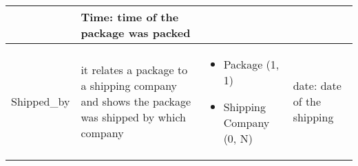 \begin{longtable}{|p{}|p{} |p{}|p{} |}
\begin{itemize}
    \end{itemize}
 &  Time: time of the package was packed  \\\hline
 
  Shipped\_by & it relates a package to a shipping company and shows the package was shipped by which company & \begin{itemize}
        \vspace{-1em}
        \item Package (1, 1)
        \item Shipping Company (0, N)
    \end{itemize}
 &  date: date of the shipping \\\hline

\end{longtable}